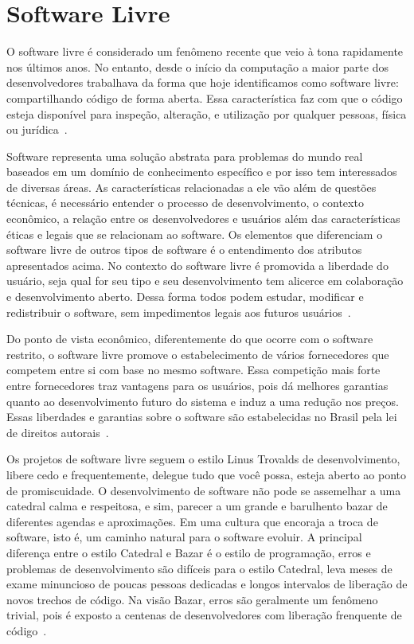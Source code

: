 \chapter[Software Livre]{Software Livre}
\label{software_livre}

O software livre é considerado um fenômeno recente que veio à tona
rapidamente nos últimos anos. No entanto, desde o início da computação a maior parte
dos desenvolvedores trabalhava da forma que hoje identificamos como software livre:
compartilhando código de forma aberta. Essa característica 
faz com que o código esteja disponível para inspeção, alteração, e utilização por qualquer
pessoas, física ou jurídica~\cite{kon2012software, Hippel:2003:OSS:970521.970585}.

Software representa uma solução abstrata para problemas do mundo real baseados
em um domínio de conhecimento específico e por isso tem interessados de 
diversas áreas. As características relacionadas a ele vão além de questões
técnicas, é necessário entender o processo de desenvolvimento, o contexto econômico,
a relação entre os desenvolvedores e usuários além das características éticas e
legais que se relacionam ao software.
%
Os elementos que diferenciam o software livre de outros tipos de software 
é o entendimento dos atributos apresentados acima. No contexto do software livre
é promovida a liberdade do usuário, seja qual for seu tipo e seu desenvolvimento
tem alicerce em colaboração e desenvolvimento aberto. Dessa forma todos podem
estudar, modificar e redistribuir o software, sem impedimentos legais aos 
futuros usuários~\cite{meirelles2013metrics}.

Do ponto de vista econômico, diferentemente do que ocorre com o software 
restrito, o software livre promove o estabelecimento
de vários fornecedores que competem entre si com base no mesmo software. Essa competição 
mais forte entre fornecedores traz vantagens para os usuários, pois dá melhores
garantias quanto ao desenvolvimento futuro do sistema e induz a uma redução nos 
preços. Essas liberdades e garantias sobre o software são estabelecidas 
no Brasil pela lei de direitos autorais~\cite{kon2012software}. 

Os projetos de software livre seguem o estilo Linus Trovalds de desenvolvimento, libere
cedo e frequentemente, delegue tudo que você possa, esteja aberto ao ponto de promiscuidade.
O desenvolvimento de software não pode se assemelhar a uma catedral calma e respeitosa, e sim, 
parecer a um grande e barulhento bazar de diferentes agendas e aproximações. 
Em uma cultura que encoraja a troca de software, isto é, um caminho natural para o software evoluir.
A principal diferença entre o estilo Catedral e Bazar é o estilo de programação, 
erros e problemas de desenvolvimento são difíceis para o estilo Catedral, leva meses 
de exame minuncioso de poucas pessoas dedicadas e longos intervalos de liberação 
de novos trechos de código.
Na visão Bazar, erros são geralmente um fenômeno trivial, pois é exposto a centenas de 
desenvolvedores com liberação frenquente de código~\cite{Raymond:1999:CB:580808}.

